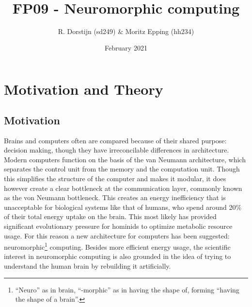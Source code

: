 \documentclass[a4paper,twocolumn]{article}
\title{FP09 - Neuromorphic computing}
\author{R. Dorstijn (sd249) \& Moritz Epping (hh234)}
\date{February 2021}
\begin{document}
\maketitle

\section{Motivation and Theory}
\subsection{Motivation}
Brains and computers often are compared because of their shared purpose:
decision making, though they have irreconcilable differences in architecture.
Modern computers function on the basis of the van Neumann
architecture\cite{von-Neumann}, which separates the control unit from the memory
and the computation unit. Though this simplifies the structure of the computer and
makes it modular, it does however create a clear bottleneck at the communication layer,
commonly known as the von Neumann bottleneck. This creates an energy
inefficiency that is unacceptable for biological systems like that of
humans, who spend around 20\% of their total energy uptake on the brain\cite{metabolic-rates}.
This most likely has provided significant evolutionary pressure for hominids to
optimize metabolic resource usage\cite{seymour2016fossil}.  For this reason a new
architecture for computers has been suggested: neuromorphic\footnote{``Neuro''
as in brain, ``-morphic'' as in having the shape of, forming ``having the shape
of a brain''.} computing.  Besides more efficient energy usage,  the scientific
interest in neuromorphic computing is also grounded in the idea of trying to
understand the human brain by rebuilding it artificially.
\end{document}
